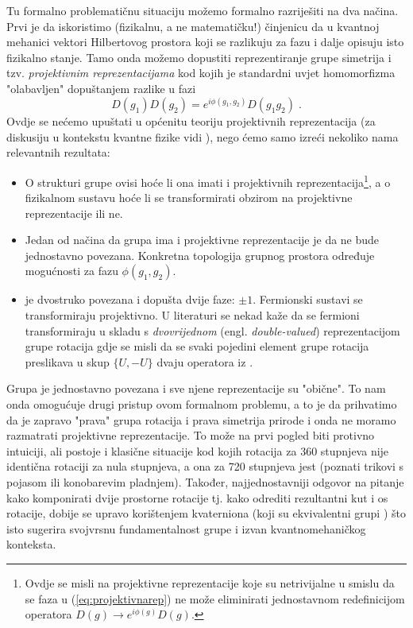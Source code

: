 Tu formalno problematičnu situaciju možemo formalno razriješiti na dva
načina. Prvi je da iskoristimo (fizikalnu, a ne matematičku!)
činjenicu da u kvantnoj mehanici vektori Hilbertovog prostora koji
se razlikuju za fazu i dalje opisuju isto fizikalno stanje.
Tamo onda možemo dopustiti reprezentiranje grupe simetrija i tzv.
\emph{projektivnim reprezentacijama} kod kojih je standardni
uvjet homomorfizma "olabavljen" dopuštanjem razlike u fazi
\begin{equation}
   D(g_1)D(g_2)=e^{i \phi(g_1,g_2)}D(g_1 g_2) \;.
   \label{eq:projektivnarep}
\end{equation}
Ovdje se nećemo upuštati u općenitu teoriju projektivnih reprezentacija 
(za diskusiju u kontekstu kvantne fizike vidi \cite{Weinberg:1995mt}),
nego ćemo samo izreći nekoliko nama relevantnih rezultata:

\begin{itemize}
    \item O strukturi grupe ovisi hoće li ona imati i projektivnih 
        reprezentacija\footnote{Ovdje se misli na projektivne reprezentacije
        koje su netrivijalne u smislu da se faza u (\ref{eq:projektivnarep})
        ne može eliminirati jednostavnom redefinicijom operatora $D(g) \to
        e^{i\phi(g)}D(g)$.}, a o fizikalnom sustavu hoće li se transformirati 
        obzirom na projektivne reprezentacije ili ne.

    \item  Jedan od načina da grupa ima i projektivne reprezentacije je da
           ne bude jednostavno povezana. Konkretna topologija grupnog prostora
           određuje mogućnosti za fazu $\phi(g_1,g_2)$.

    \item {} je dvostruko povezana i dopušta dvije faze: $\pm 1$. Fermionski
          sustavi se transformiraju projektivno. U literaturi se nekad kaže
          da se fermioni transformiraju u skladu s \emph{dvovrijednom} (engl.
          \emph{double-valued}) reprezentacijom grupe rotacija gdje se misli
          da se svaki pojedini element grupe rotacija preslikava
          u skup $\{U, -U\}$ dvaju operatora iz .
\end{itemize}

Grupa  je jednostavno povezana i sve njene reprezentacije su "obične".
To nam onda omogućuje drugi pristup ovom formalnom problemu, a to je da
prihvatimo da je zapravo  "prava" grupa rotacija i prava simetrija prirode
i onda ne moramo razmatrati projektivne reprezentacije.
To može na prvi pogled biti protivno intuiciji, ali postoje i klasične
situacije kod kojih rotacija za 360 stupnjeva nije identična
rotaciji za nula stupnjeva, a ona za 720 stupnjeva jest (poznati trikovi
s pojasom ili konobarevim pladnjem). Također, najjednostavniji odgovor na
pitanje kako komponirati dvije prostorne rotacije tj. kako odrediti
rezultantni kut i os rotacije, dobije se upravo korištenjem
kvaterniona (koji su ekvivalentni grupi ) što isto sugerira svojvrsnu
fundamentalnost grupe  i izvan kvantnomehaničkog konteksta.

